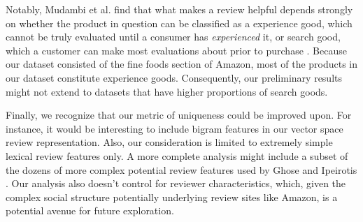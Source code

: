 \documentclass[10pt]{article}
\begin{document}
Notably, Mudambi et al. find that what makes a review helpful depends strongly on whether the product in question can be classified as a experience good, which cannot be truly evaluated until a consumer has \emph{experienced} it, or search good, which a customer can make most evaluations about prior to purchase \cite{mudambi2010makes}. Because our dataset consisted of the fine foods section of Amazon, most of the products in our dataset constitute experience goods. Consequently, our preliminary results might not extend to datasets that have higher proportions of search goods.

Finally, we recognize that our metric of uniqueness could be improved upon. For instance, it would be interesting to include bigram features in our vector space review representation. Also, our consideration is limited to extremely simple lexical review features only. A more complete analysis might include a subset of the dozens of more complex potential review features used by Ghose and Ipeirotis \cite{ghose2011estimating}. Our analysis also doesn't control for reviewer characteristics, which, given the complex social structure potentially underlying review sites like Amazon, is a potential avenue for future exploration.


\end{document}
